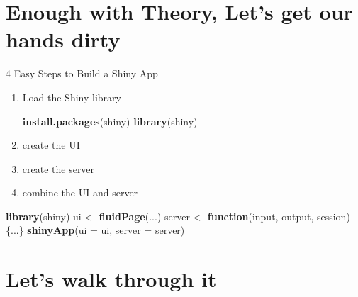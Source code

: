 \documentclass[
  ignorenonframetext,
]{beamer}
\newenvironment{Shaded}{\begin{snugshade}}{\end{snugshade}}
\newcommand{\ControlFlowTok}[1]{\textcolor[rgb]{0.13,0.29,0.53}{\textbf{#1}}}
\newcommand{\DataTypeTok}[1]{\textcolor[rgb]{0.13,0.29,0.53}{#1}}
\newcommand{\KeywordTok}[1]{\textcolor[rgb]{0.13,0.29,0.53}{\textbf{#1}}}
\newcommand{\NormalTok}[1]{#1}
\newcommand{\StringTok}[1]{\textcolor[rgb]{0.31,0.60,0.02}{#1}}
\begin{document}
\hypertarget{enough-with-theory-lets-get-our-hands-dirty}{%
\section{Enough with Theory, Let's get our hands
dirty}\label{enough-with-theory-lets-get-our-hands-dirty}}

\begin{frame}[fragile]{4 Easy Steps to Build a Shiny App}
\protect\hypertarget{easy-steps-to-build-a-shiny-app}{}

\begin{enumerate}[<+->]
\item
  Load the Shiny library

\begin{Shaded}
\begin{Highlighting}[]
\KeywordTok{install.packages}\NormalTok{(}\StringTok{\textquotesingle{}shiny\textquotesingle{}}\NormalTok{)}
\KeywordTok{library}\NormalTok{(}\StringTok{\textquotesingle{}shiny\textquotesingle{}}\NormalTok{)}
\end{Highlighting}
\end{Shaded}
\item
  create the UI
\item
  create the server
\item
  combine the UI and server
\end{enumerate}

\begin{Shaded}
\begin{Highlighting}[]
\KeywordTok{library}\NormalTok{(shiny) }
\NormalTok{ui <{-}}\StringTok{ }\KeywordTok{fluidPage}\NormalTok{(...) }
\NormalTok{server <{-}}\StringTok{ }\ControlFlowTok{function}\NormalTok{(input, output, session) \{...\} }
\KeywordTok{shinyApp}\NormalTok{(}\DataTypeTok{ui =}\NormalTok{ ui, }\DataTypeTok{server =}\NormalTok{ server)}
\end{Highlighting}
\end{Shaded}

\end{frame}

\hypertarget{lets-walk-through-it}{%
\section{Let's walk through it}\label{lets-walk-through-it}}
\end{document}
